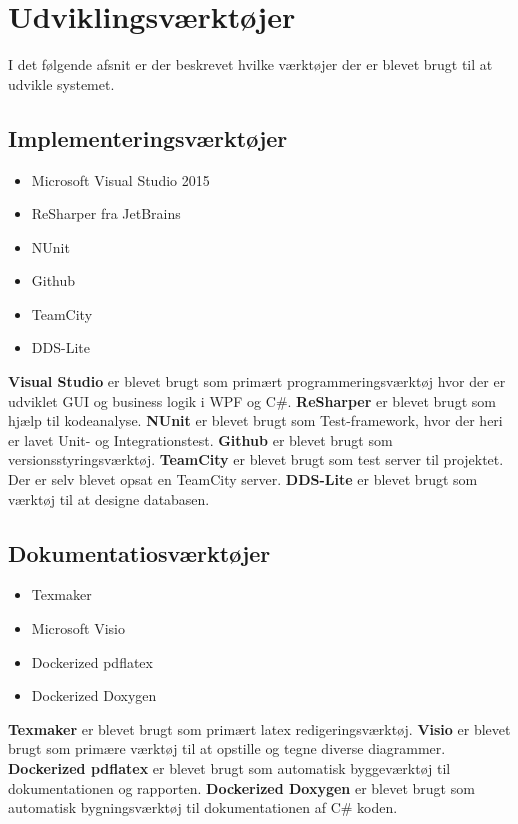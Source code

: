 \section{Udviklingsværktøjer}
\label{developmentstool}
I det følgende afsnit er der beskrevet hvilke værktøjer der er blevet brugt til at udvikle systemet. 

\subsection*{Implementeringsværktøjer}
\begin{itemize}
	\item Microsoft Visual Studio 2015
	\item ReSharper fra JetBrains
	\item NUnit 
	\item Github
	\item TeamCity
	\item DDS-Lite	
\end{itemize}
\textbf{Visual Studio} er blevet brugt som primært programmeringsværktøj hvor der er udviklet GUI og business logik i WPF og C\#. \textbf{ReSharper} er blevet brugt som hjælp til kodeanalyse. \textbf{NUnit} er blevet brugt som Test-framework, hvor der heri er lavet Unit- og Integrationstest. \textbf{Github} er blevet brugt som  versionsstyringsværktøj. \textbf{TeamCity} er blevet brugt som test server til projektet. Der er selv blevet opsat en TeamCity server. \textbf{DDS-Lite} er blevet brugt som værktøj til at designe databasen. 

\subsection*{Dokumentatiosværktøjer}
\begin{itemize}
	\item Texmaker
	\item Microsoft Visio
	\item Dockerized pdflatex
	\item Dockerized Doxygen
\end{itemize}
\textbf{Texmaker} er blevet brugt som primært latex redigeringsværktøj. \textbf{Visio} er blevet brugt som primære værktøj til at opstille og tegne diverse diagrammer. \textbf{Dockerized pdflatex} er blevet brugt som automatisk byggeværktøj til dokumentationen og rapporten. \textbf{Dockerized Doxygen} er blevet brugt som automatisk bygningsværktøj til dokumentationen af C\# koden. 
